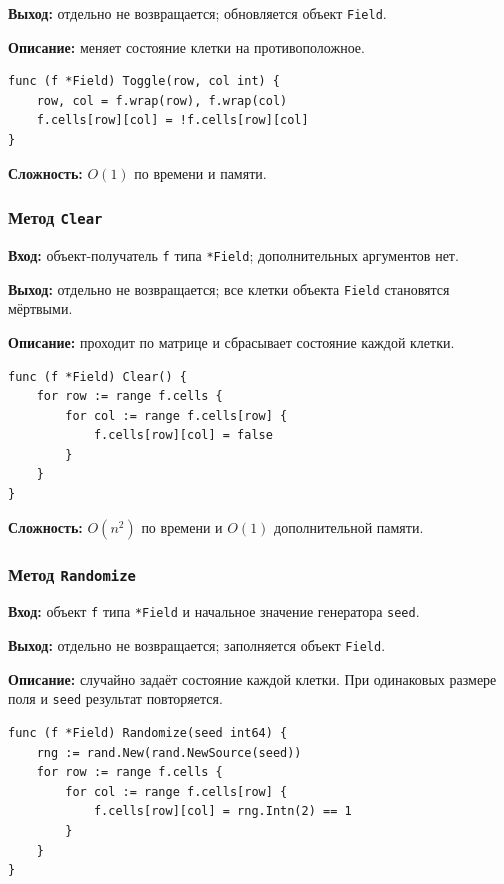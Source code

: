 \textbf{Выход:} отдельно не возвращается; обновляется объект \texttt{Field}.

\textbf{Описание:} меняет состояние клетки на противоположное.

\begin{lstlisting}[style=gostyle,caption={Переключение состояния клетки}]
func (f *Field) Toggle(row, col int) {
    row, col = f.wrap(row), f.wrap(col)
    f.cells[row][col] = !f.cells[row][col]
}
\end{lstlisting}

\textbf{Сложность:} $O(1)$ по времени и памяти.

\subsubsection{Метод \texttt{Clear}}
\textbf{Вход:} объект-получатель \texttt{f} типа \texttt{*Field};
дополнительных аргументов нет.

\textbf{Выход:} отдельно не возвращается; все клетки объекта \texttt{Field}
становятся мёртвыми.

\textbf{Описание:} проходит по матрице и сбрасывает состояние каждой клетки.

\begin{lstlisting}[style=gostyle,caption={Очистка поля}]
func (f *Field) Clear() {
    for row := range f.cells {
        for col := range f.cells[row] {
            f.cells[row][col] = false
        }
    }
}
\end{lstlisting}

\textbf{Сложность:} $O(n^2)$ по времени и $O(1)$ дополнительной памяти.

\subsubsection{Метод \texttt{Randomize}}
\textbf{Вход:} объект \texttt{f} типа \texttt{*Field} и начальное
значение генератора \texttt{seed}.

\textbf{Выход:} отдельно не возвращается; заполняется объект \texttt{Field}.

\textbf{Описание:} случайно задаёт состояние каждой клетки. При одинаковых
размере поля и \texttt{seed} результат повторяется.

\begin{lstlisting}[style=gostyle,caption={Случайное заполнение поля}]
func (f *Field) Randomize(seed int64) {
    rng := rand.New(rand.NewSource(seed))
    for row := range f.cells {
        for col := range f.cells[row] {
            f.cells[row][col] = rng.Intn(2) == 1
        }
    }
}
\end{lstlisting}

